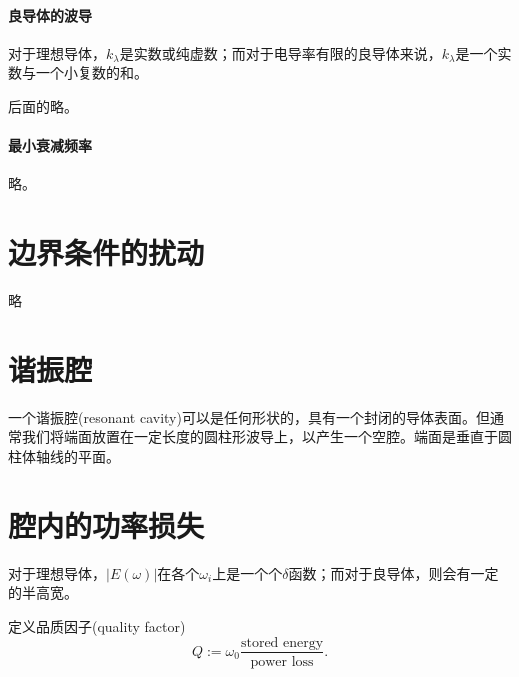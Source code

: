 \paragraph{良导体的波导}
对于理想导体，$k_\lambda$是实数或纯虚数；而对于电导率有限的良导体来说，$k_\lambda$是一个实数与一个小复数的和。

后面的略。
\paragraph{最小衰减频率}
略。
\section{边界条件的扰动}
略
\section{谐振腔}
一个谐振腔(resonant cavity)可以是任何形状的，具有一个封闭的导体表面。但通常我们将端面放置在一定长度的圆柱形波导上，以产生一个空腔。端面是垂直于圆柱体轴线的平面。





\section{腔内的功率损失}
对于理想导体，$|E(\omega)|$在各个$\omega_i$上是一个个$\delta$函数；而对于良导体，则会有一定的半高宽。

定义品质因子(quality factor)
\begin{equation}
    Q:=\omega_0\frac{\text{stored energy}}{\text{power loss}}.
\end{equation}

